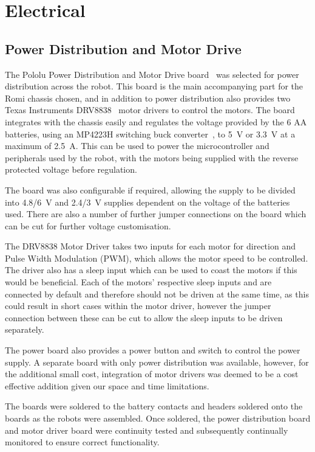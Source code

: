 
\chapter{Electrical}\label{electrical}

\section{Power Distribution and Motor Drive}\label{elec/poweranddrive}
The Pololu Power Distribution and Motor Drive board~\cite{pololupower}
was selected for power distribution across
the robot. This board is the main accompanying part for the Romi
chassis chosen, and in addition to power distribution also provides
two Texas Instruments DRV8838~\cite{texasdrivers} motor drivers to control
the motors. The board integrates with the chassis easily
and regulates the voltage provided by the 6 AA batteries, using an
MP4223H switching buck converter~\cite{mpbuck}, to \SI{5}{\volt} or
\SI{3.3}{\volt} at a maximum of \SI{2.5}{\ampere}. This can be used
to power the microcontroller and peripherals used by the robot, with the 
motors being supplied with the reverse protected voltage before regulation.

The board was also configurable if required, allowing the supply to be
divided into \SI{4.8/6}{\volt} and \SI{2.4/3}{\volt} supplies dependent on
the voltage of the batteries used. There are also a number of further jumper
connections on the board which can be cut for further voltage customisation.

The DRV8838 Motor Driver takes two inputs for each motor for direction and Pulse
Width Modulation (PWM), which allows the motor speed to be controlled. The
driver also has a sleep input which can be used to coast the motors if
this would be beneficial. Each of the motors' respective sleep inputs
and are connected by default and therefore should not be driven at the same time,
as this could result in short cases within the motor driver, however the
jumper connection between these can be cut to allow the sleep inputs to
be driven separately.

The power board also provides a power button and switch to control the
power supply. A separate board with only power distribution was
available, however, for the additional small cost, integration of
motor drivers was deemed to be a cost effective addition given our 
space and time limitations.

The boards were soldered to the battery contacts and headers soldered
onto the boards as the robots were assembled. Once soldered, the power 
distribution board and motor driver board were continuity tested and
subsequently continually monitored to ensure correct functionality.  

